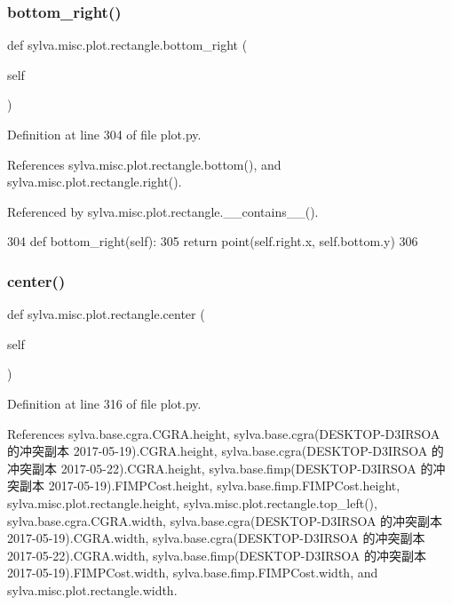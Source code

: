 \subsubsection{\texorpdfstring{bottom\+\_\+right()}{bottom\_right()}}
{\footnotesize\ttfamily def sylva.\+misc.\+plot.\+rectangle.\+bottom\+\_\+right (\begin{DoxyParamCaption}\item[{}]{self }\end{DoxyParamCaption})}



Definition at line 304 of file plot.\+py.



References sylva.\+misc.\+plot.\+rectangle.\+bottom(), and sylva.\+misc.\+plot.\+rectangle.\+right().



Referenced by sylva.\+misc.\+plot.\+rectangle.\+\_\+\+\_\+contains\+\_\+\+\_\+().


\begin{DoxyCode}
304         \textcolor{keyword}{def }bottom\_right(self):
305             \textcolor{keywordflow}{return} point(self.right.x, self.bottom.y)
306 
\end{DoxyCode}
\mbox{\label{classsylva_1_1misc_1_1plot_1_1rectangle_a0466258315b096cd7f4e1918a1007488}} 
\subsubsection{\texorpdfstring{center()}{center()}}
{\footnotesize\ttfamily def sylva.\+misc.\+plot.\+rectangle.\+center (\begin{DoxyParamCaption}\item[{}]{self }\end{DoxyParamCaption})}



Definition at line 316 of file plot.\+py.



References sylva.\+base.\+cgra.\+C\+G\+R\+A.\+height, sylva.\+base.\+cgra(\+D\+E\+S\+K\+T\+O\+P-\/\+D3\+I\+R\+S\+O\+A 的冲突副本 2017-\/05-\/19).\+C\+G\+R\+A.\+height, sylva.\+base.\+cgra(\+D\+E\+S\+K\+T\+O\+P-\/\+D3\+I\+R\+S\+O\+A 的冲突副本 2017-\/05-\/22).\+C\+G\+R\+A.\+height, sylva.\+base.\+fimp(\+D\+E\+S\+K\+T\+O\+P-\/\+D3\+I\+R\+S\+O\+A 的冲突副本 2017-\/05-\/19).\+F\+I\+M\+P\+Cost.\+height, sylva.\+base.\+fimp.\+F\+I\+M\+P\+Cost.\+height, sylva.\+misc.\+plot.\+rectangle.\+height, sylva.\+misc.\+plot.\+rectangle.\+top\+\_\+left(), sylva.\+base.\+cgra.\+C\+G\+R\+A.\+width, sylva.\+base.\+cgra(\+D\+E\+S\+K\+T\+O\+P-\/\+D3\+I\+R\+S\+O\+A 的冲突副本 2017-\/05-\/19).\+C\+G\+R\+A.\+width, sylva.\+base.\+cgra(\+D\+E\+S\+K\+T\+O\+P-\/\+D3\+I\+R\+S\+O\+A 的冲突副本 2017-\/05-\/22).\+C\+G\+R\+A.\+width, sylva.\+base.\+fimp(\+D\+E\+S\+K\+T\+O\+P-\/\+D3\+I\+R\+S\+O\+A 的冲突副本 2017-\/05-\/19).\+F\+I\+M\+P\+Cost.\+width, sylva.\+base.\+fimp.\+F\+I\+M\+P\+Cost.\+width, and sylva.\+misc.\+plot.\+rectangle.\+width.


